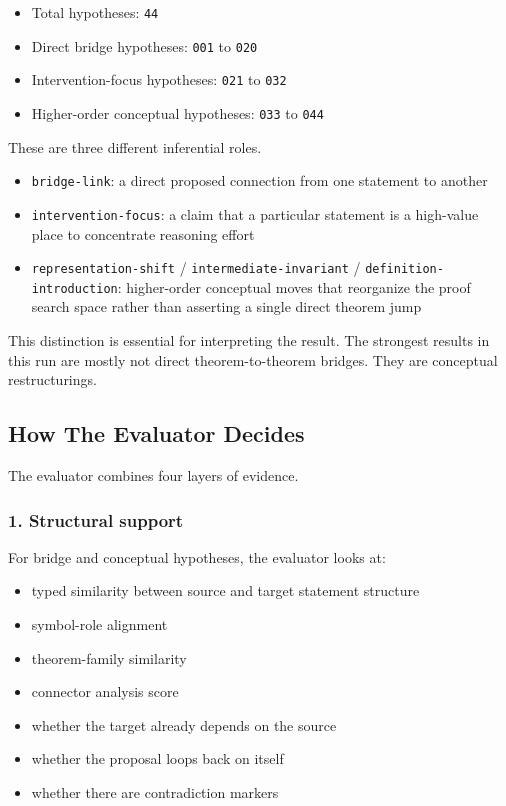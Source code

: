 \documentclass[
]{article}
\providecommand{\tightlist}{%
  \setlength{\itemsep}{0pt}\setlength{\parskip}{0pt}}
\begin{document}
\begin{itemize}
\tightlist
\item
  Total hypotheses: \texttt{44}
\item
  Direct bridge hypotheses: \texttt{001} to \texttt{020}
\item
  Intervention-focus hypotheses: \texttt{021} to \texttt{032}
\item
  Higher-order conceptual hypotheses: \texttt{033} to \texttt{044}
\end{itemize}

These are three different inferential roles.

\begin{itemize}
\tightlist
\item
  \texttt{bridge-link}: a direct proposed connection from one statement
  to another
\item
  \texttt{intervention-focus}: a claim that a particular statement is a
  high-value place to concentrate reasoning effort
\item
  \texttt{representation-shift} / \texttt{intermediate-invariant} /
  \texttt{definition-introduction}: higher-order conceptual moves that
  reorganize the proof search space rather than asserting a single
  direct theorem jump
\end{itemize}

This distinction is essential for interpreting the result. The strongest
results in this run are mostly not direct theorem-to-theorem bridges.
They are conceptual restructurings.

\subsection{How The Evaluator Decides}\label{how-the-evaluator-decides}

The evaluator combines four layers of evidence.

\subsubsection{1. Structural support}\label{1-structural-support}

For bridge and conceptual hypotheses, the evaluator looks at:

\begin{itemize}
\tightlist
\item
  typed similarity between source and target statement structure
\item
  symbol-role alignment
\item
  theorem-family similarity
\item
  connector analysis score
\item
  whether the target already depends on the source
\item
  whether the proposal loops back on itself
\item
  whether there are contradiction markers
\end{itemize}
\end{document}
